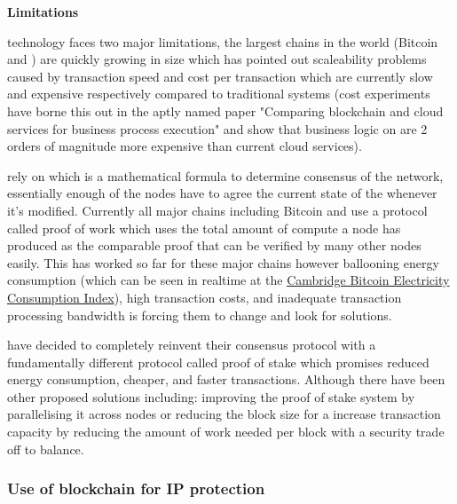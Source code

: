 {\noindent\regular\textbf{Limitations}\vspace{2mm}}

\noindent{} technology faces two major limitations, the largest chains in the world (Bitcoin and ) are quickly growing in size which has pointed out scaleability problems caused by transaction speed and cost per transaction which are currently slow and expensive respectively compared to traditional systems (cost experiments have borne this out in the aptly named paper "Comparing blockchain and cloud services for business process execution"\cite{rimba2017comparing} and show that business logic on  are 2 orders of magnitude more expensive than current cloud services).

 rely on  which is a mathematical formula to determine consensus of the network, essentially enough of the nodes have to agree the current state of the  whenever it's modified. Currently all major chains including Bitcoin and  use a protocol called proof of work\cite{PoW} which uses the total amount of compute a node has produced as the comparable proof that can be verified by many other nodes easily. This has worked so far for these major chains however ballooning energy consumption (which can be seen in realtime at the \href{https://ccaf.io/cbeci/index}{Cambridge Bitcoin Electricity Consumption Index}), high transaction costs, and inadequate transaction processing bandwidth is forcing them to change and look for solutions.

 have decided to completely reinvent their consensus protocol with a fundamentally different protocol called proof of stake which promises reduced energy consumption, cheaper, and faster transactions\cite{PoS}. Although there have been other proposed solutions including: improving the proof of stake system by parallelising it across nodes\cite{fi12080125} or reducing the block size for a increase transaction capacity by reducing the amount of work needed per block with a security trade off to balance\cite{kiayias2015speed}.

\subsubsection{Use of blockchain for IP protection}

